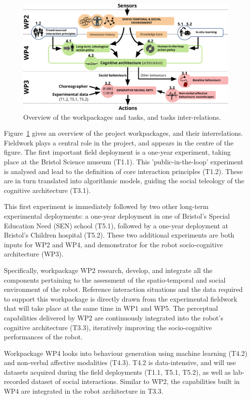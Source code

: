 \documentclass[11pt,a4paper]{report}
\begin{document}
\begin{figure}[h!]
\centering
\includegraphics[width=\linewidth]{figs/archi}
\caption{Overview of the workpackages and tasks, and tasks inter-relations.}
\label{fig:archi}
\end{figure}

Figure~\ref{fig:archi} gives an overview of the project workpackages, and their
interrelations. Fieldwork plays a central role in the project, and appears in
the centre of the figure. The first important field deployment is a one-year
experiment, taking place at the Bristol Science museum (T1.1). This
'public-in-the-loop' experiment is analysed and lead to the definition of core
interaction principles (T1.2). These are in turn translated into algorithmic
models, guiding the social teleology of the cognitive architecture (T3.1).

This first experiment is immediately followed by two other long-term
experimental deployments: a one-year deployment in one of Bristol's Special
Education Need (SEN) school (T5.1), followed by a one-year deployment at
Bristol's Children hospital (T5.2). These two additional experiments are both
inputs for WP2 and WP4, and demonstrator for the robot socio-cognitive
architecture (WP3).

Specifically, workpackage WP2 research, develop, and integrate all the components
pertaining to the assessment of the spatio-temporal and social environment of
the robot. Reference interaction situations and the data required to support
this workpackage is directly drawn from the experimental fieldwork that will
take place at the same time in WP1 and WP5. The perceptual capabilities
delivered by WP2 are continuously integrated into the robot's cognitive
architecture (T3.3), iteratively improving the socio-cognitive performances of
the robot.

Workpackage WP4 looks into behaviour generation using machine learning (T4.2)
and non-verbal affective modalities (T4.3). T4.2 is data-intensive, and will use
datasets acquired during the field deployments (T1.1, T5.1, T5.2), as well as
lab-recorded dataset of social interactions. Similar to WP2, the capabilities
built in WP4 are integrated in the robot architecture in T3.3.
\end{document}

